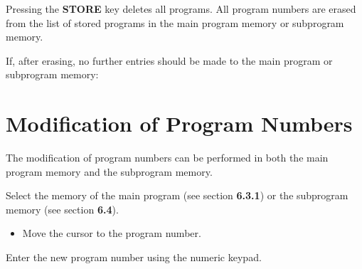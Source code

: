 \vspace{.5cm}

Pressing the \textbf{STORE} key deletes all programs.  
All program numbers are erased from the list of stored programs in the main program memory or subprogram memory.

If, after erasing, no further entries should be made to the main program or subprogram memory:

\begin{itemize}
\end{itemize}

\section{Modification of Program Numbers}

The modification of program numbers can be performed in both the main program memory and the subprogram memory.

Select the memory of the main program (see section \textbf{6.3.1}) or the subprogram memory (see section \textbf{6.4}).

\procedure

\begin{itemize}
\end{itemize}

\vspace{.5cm}

\begin{itemize}
\end{itemize}

\vspace{.5cm}

\begin{itemize}
    \item Move the cursor to the program number.
\end{itemize}

Enter the new program number using the numeric keypad.

\begin{itemize}
\end{itemize}

\vspace{.5cm}

\begin{itemize}
\end{itemize}


